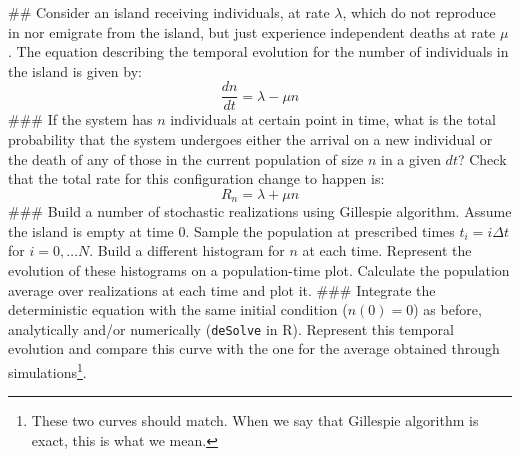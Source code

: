 \documentclass{article}
\newenvironment{problem}[2][Problem]{\begin{trivlist}
\item[\hskip \labelsep {\bfseries #1}\hskip \labelsep {\bfseries #2.}]}{\end{trivlist}}
\newenvironment{solution}{\begin{proof}[Solution]}{\end{proof}}
\begin{document}
\begin{easylist}[enumerate]
## Consider an island receiving individuals, at rate $\lambda$, which do not reproduce in nor emigrate from the island, but just experience independent deaths at rate $\mu$. The equation describing the temporal evolution for the number of individuals in the island is given by:
$$ \frac{dn}{dt} = \lambda - \mu n $$
### If the system has $n$ individuals at certain point in time, what is the total probability that the system undergoes either the arrival on a new individual or the  death of any of those in the current population of size $n$ in a given $dt$? Check that the total rate for this configuration change to happen is:
$$R_n = \lambda + \mu n$$ 
### Build a number of stochastic realizations using Gillespie algorithm. Assume the island is empty at time 0. Sample the population at prescribed times $t_i = i \Delta t$ for $i=0, \dots N$. Build a different histogram for $n$ at each time. Represent the evolution of these histograms on a population-time plot. Calculate the population average over realizations at each time and plot it. 
### Integrate the deterministic equation with the same initial condition ($n(0)=0$) as before, analytically and/or numerically ({\tt deSolve} in R). Represent this temporal evolution and compare this curve with the one for the average obtained through simulations\footnote{These two curves should match. When we say that Gillespie algorithm is exact, this is what we mean.}.
\end{easylist}






\end{document}
